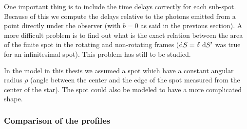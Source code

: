 \documentclass{wihuri}
\def\be{\begin{equation}}
\def\ee{\end{equation}}
\def\d{{\rm d}}
\def\Dop{\delta}
\begin{document}
One important thing is to include the time delays correctly for each sub-spot. Because of this we compute the delays relative to the photons emitted from a point directly under the observer (with $b=0$ as said in the previous section). %
A more difficult problem is to find out what is the exact relation between the area of the finite spot in the rotating and non-rotating frames ($\d S=\Dop\ \d S'$ was true for an infinitesimal spot). This problem has still to be studied.


In the model in this thesis we assumed a spot which have a constant angular radius $\rho$ (angle between the center and the edge of the spot measured from the center of the star). %
The spot could also be modeled to have a more complicated shape. %






\subsubsection{Comparison of the profiles}
\end{document}

